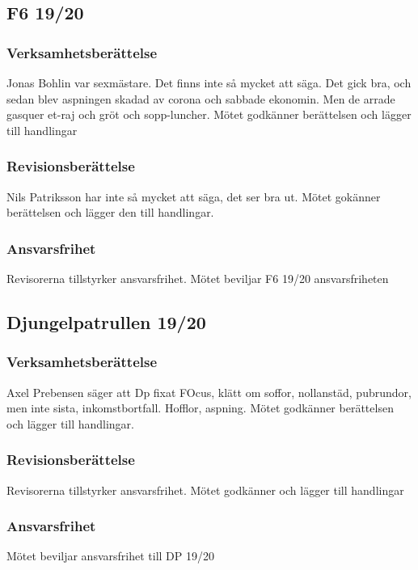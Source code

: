 \documentclass[hidelinks]{../sektionsmote} %
\begin{document}
\subsection{F6 19/20}

\subsubsection{Verksamhetsberättelse}

Jonas Bohlin var sexmästare.
Det finns inte så mycket att säga. Det gick bra, och sedan blev aspningen skadad av corona och sabbade ekonomin.
Men de arrade gasquer et-raj och gröt och sopp-luncher.
Mötet godkänner berättelsen och lägger till handlingar

\subsubsection{Revisionsberättelse}
Nils Patriksson har inte så mycket att säga, det ser bra ut.
Mötet gokänner berättelsen och lägger den till handlingar.

\subsubsection{Ansvarsfrihet}
Revisorerna tillstyrker ansvarsfrihet.
Mötet beviljar F6 19/20 ansvarsfriheten

\subsection{Djungelpatrullen 19/20}

\subsubsection{Verksamhetsberättelse}
Axel Prebensen säger att Dp fixat FOcus, klätt om soffor, nollanstäd, pubrundor, men inte sista, inkomstbortfall.
Hofflor, aspning.
Mötet godkänner berättelsen och lägger till handlingar.

\subsubsection{Revisionsberättelse}
Revisorerna tillstyrker ansvarsfrihet.
Mötet godkänner och lägger till handlingar

\subsubsection{Ansvarsfrihet}
Mötet beviljar ansvarsfrihet till DP 19/20
\end{document}
